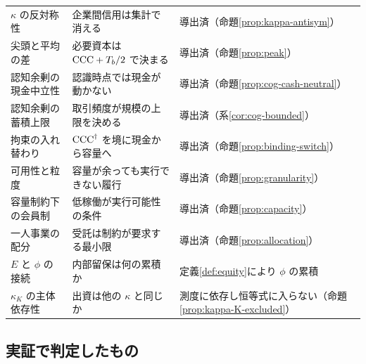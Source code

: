 \begin{longtable}{@{}>{\raggedright\arraybackslash}p{}>{\raggedright\arraybackslash}p{}>{\raggedright\arraybackslash}p{}@{}}
$\kappa$ の反対称性 & 企業間信用は集計で消える & 導出済（命題\ref{prop:kappa-antisym}） \\
尖頭と平均の差 & 必要資本は $\mathrm{CCC}+T_b/2$ で決まる & 導出済（命題\ref{prop:peak}） \\
認知余剰の現金中立性 & 認識時点では現金が動かない & 導出済（命題\ref{prop:cog-cash-neutral}） \\
認知余剰の蓄積上限 & 取引頻度が規模の上限を決める & 導出済（系\ref{cor:cog-bounded}） \\
拘束の入れ替わり & $\mathrm{CCC}^{\dagger}$ を境に現金から容量へ & 導出済（命題\ref{prop:binding-switch}） \\
可用性と粒度 & 容量が余っても実行できない履行 & 導出済（命題\ref{prop:granularity}） \\
容量制約下の会員制 & 低稼働が実行可能性の条件 & 導出済（命題\ref{prop:capacity}） \\
一人事業の配分 & 受託は制約が要求する最小限 & 導出済（命題\ref{prop:allocation}） \\
$E$ と $\phi$ の接続 & 内部留保は何の累積か & 定義\ref{def:equity}により $\phi$ の累積 \\
$\kappa_K$ の主体依存性 & 出資は他の $\kappa$ と同じか & 測度に依存し恒等式に入らない（命題\ref{prop:kappa-K-excluded}） \\
\end{longtable}

\subsection{実証で判定したもの}

